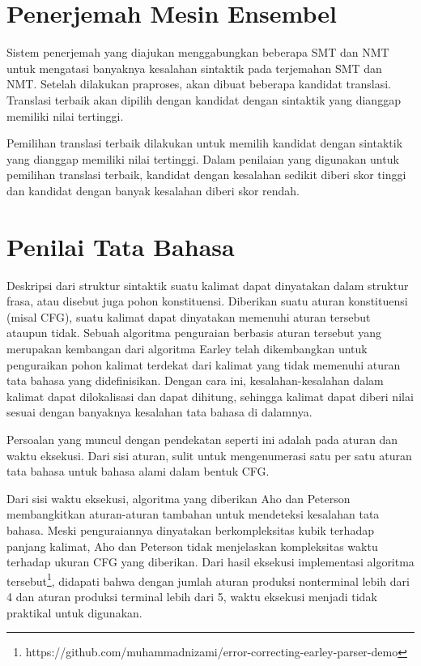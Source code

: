 \documentclass[conference]{IEEEtran}
\begin{document}
\section{Penerjemah Mesin Ensembel}

Sistem penerjemah yang diajukan menggabungkan beberapa SMT dan NMT untuk mengatasi banyaknya kesalahan sintaktik pada terjemahan SMT dan NMT. Setelah dilakukan praproses, akan dibuat beberapa kandidat translasi. Translasi terbaik akan dipilih dengan kandidat dengan sintaktik yang dianggap memiliki nilai tertinggi.

Pemilihan translasi terbaik dilakukan untuk memilih kandidat dengan sintaktik yang dianggap memiliki nilai tertinggi. Dalam penilaian yang digunakan untuk pemilihan translasi terbaik, kandidat dengan kesalahan sedikit diberi skor tinggi dan kandidat dengan banyak kesalahan diberi skor rendah.

\section{Penilai Tata Bahasa}

Deskripsi dari struktur sintaktik suatu kalimat dapat dinyatakan dalam struktur frasa, atau disebut juga pohon konstituensi. Diberikan suatu aturan konstituensi (misal CFG), suatu kalimat dapat dinyatakan memenuhi aturan tersebut ataupun tidak\cite{b1}. Sebuah algoritma penguraian berbasis aturan tersebut \cite{b2} yang merupakan kembangan dari algoritma Earley \cite{b3} telah dikembangkan untuk penguraikan pohon kalimat terdekat dari kalimat yang tidak memenuhi aturan tata bahasa yang didefinisikan. Dengan cara ini, kesalahan-kesalahan dalam kalimat dapat dilokalisasi dan dapat dihitung, sehingga kalimat dapat diberi nilai sesuai dengan banyaknya kesalahan tata bahasa di dalamnya.

Persoalan yang muncul dengan pendekatan seperti ini adalah pada aturan dan waktu eksekusi. Dari sisi aturan, sulit untuk mengenumerasi satu per satu aturan tata bahasa untuk bahasa alami dalam bentuk CFG.

Dari sisi waktu eksekusi, algoritma yang diberikan Aho dan Peterson \cite{b2} membangkitkan aturan-aturan tambahan untuk mendeteksi kesalahan tata bahasa. Meski penguraiannya dinyatakan berkompleksitas kubik terhadap panjang kalimat, Aho dan Peterson tidak menjelaskan kompleksitas waktu terhadap ukuran CFG yang diberikan. Dari hasil eksekusi implementasi algoritma tersebut\footnote{https://github.com/muhammadnizami/error-correcting-earley-parser-demo}, didapati bahwa dengan jumlah aturan produksi nonterminal lebih dari 4 dan aturan produksi terminal lebih dari 5, waktu eksekusi menjadi tidak praktikal untuk digunakan.
\end{document}
